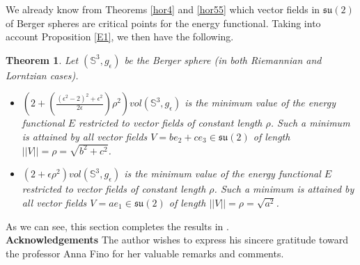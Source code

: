 \documentclass[11pt,oneside,leqno]{amsart}
\theoremstyle{plain}
\newtheorem{theorem}{Theorem}[section]
\begin{document}
We already know from Theorems \ref{hor4} and \ref{hor55} which vector fields in ${{\mathfrak{su}}}(2)$ of Berger spheres
are critical points for
the energy functional. Taking into account Proposition \eqref{E1}, we then have the following. 
\begin{theorem}
Let $({{\mathbb S}}^3, g_{\epsilon})$ be the Berger sphere (in both Riemannian and Lorntzian cases).
\begin{itemize}
\item[$(a)$] 
 $(2+(\frac{(\epsilon^2-2)^2+\epsilon^2}{2\epsilon})\rho^2)vol({{\mathbb S}}^3, g_{\epsilon})$ is the minimum value of the energy functional $E$ restricted to vector fields of constant length $\rho$. Such a minimum is attained by all vector fields $V=be_2+ce_3\in {{\mathfrak{su}}}(2)$ of length $||V||=\rho=\sqrt{b^2+c^2}$.
 \item[$(b)$] 
 $(2+\epsilon \rho^2)vol({{\mathbb S}}^3, g_{\epsilon})$ is the minimum value of the energy functional $E$ restricted to vector fields of constant length $\rho$. Such a minimum is attained by all vector fields $V=ae_1\in {{\mathfrak{su}}}(2)$ of length $||V||=\rho=\sqrt{a^2}$.
 \end{itemize}
\end{theorem}
As we can see, this section completes the results in \cite{g22}. \\
{\bf Acknowledgements}
The author wishes to express his sincere gratitude toward the professor Anna Fino for her valuable
remarks and comments.
\end{document}
